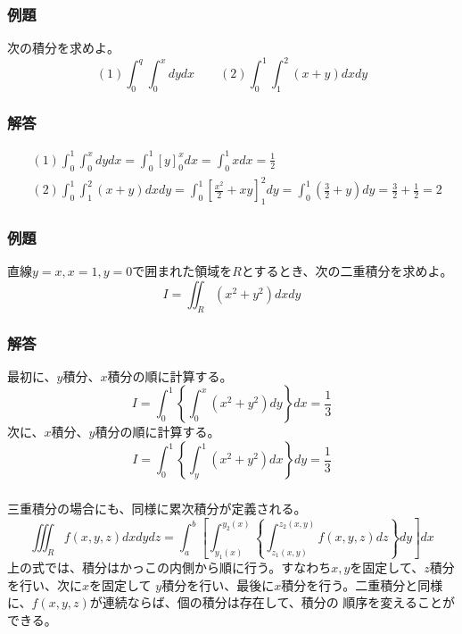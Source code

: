 \documentclass[a4j,dvipdfmx]{jsarticle}
\begin{document}
\subsubsection*{例題}
次の積分を求めよ。
\begin{equation*}
    (1)\int_0^q\int_0^xdydx\qquad(2)\int_0^1\int_1^2(x+y)dxdy
\end{equation*}

\subsubsection*{解答}
\begin{align*}
    &(1)\int_0^1\int_0^xdydx=\int_0^1[y]_0^xdx=\int_0^1xdx=\frac{1}{2}\\
    &(2)\int_0^1\int_1^2(x+y)dxdy=\int_0^1\left[\frac{x^2}{2}+xy\right]_1^2dy=
    \int_0^1(\frac{3}{2}+y)dy=\frac{3}{2}+\frac{1}{2}=2
\end{align*}

\subsubsection*{例題}
直線$y=x,x=1,y=0$で囲まれた領域を$R$とするとき、次の二重積分を求めよ。
\begin{equation*}
    I=\iint_R(x^2+y^2)dxdy
\end{equation*}

\subsubsection*{解答}
最初に、$y$積分、$x$積分の順に計算する。
\begin{equation*}
    I=\int_0^1\left\{\int_0^x (x^2+y^2)dy\right\}dx=\frac{1}{3}
\end{equation*}
次に、$x$積分、$y$積分の順に計算する。
\begin{equation*}
    I=\int_0^1\left\{\int_y^1(x^2+y^2)dx\right\}dy=\frac{1}{3}
\end{equation*}
\subsubsection*{}
三重積分の場合にも、同様に累次積分が定義される。
\begin{equation}
    \iiint_R f(x,y,z)dxdydz=\int_a^b\left[\int_{y_1(x)}^{y_2(x)}\left\{\int_{z_1(x,y)}^{z_2(x,y)}f(x,y,z)dz\right\}dy\right]dx\label{6.14}
\end{equation}
上の式では、積分はかっこの内側から順に行う。すなわち$x,y$を固定して、$z$積分を行い、次に$x$を固定して
$y$積分を行い、最後に$x$積分を行う。二重積分と同様に、$f(x,y,z)$が連続ならば、個の積分は存在して、積分の
順序を変えることができる。
\end{document}
